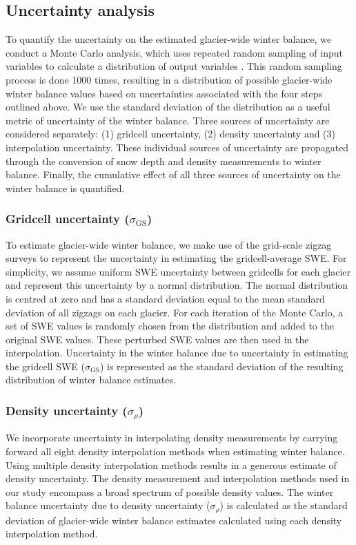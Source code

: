 \documentclass[twocolumn, letterpaper]{igs}
\begin{document}
\subsection{Uncertainty analysis}

To quantify the uncertainty on the estimated glacier-wide winter balance, we conduct a Monte Carlo analysis, which uses repeated random sampling of input variables to calculate a distribution of output variables \citep{Metropolis1949}. This random sampling process is done 1000 times, resulting in a distribution of possible glacier-wide winter balance values based on uncertainties associated with the four steps outlined above. We use the standard deviation of the distribution as a useful metric of uncertainty of the winter balance. Three sources of uncertainty are considered separately: (1) gridcell uncertainty, (2) density uncertainty and (3) interpolation uncertainty. These individual sources of uncertainty are propagated through the conversion of snow depth and density measurements to winter balance. Finally, the cumulative effect of all three sources of uncertainty on the winter balance is quantified.

	\subsubsection{Gridcell uncertainty ($\sigma_{\mathrm{GS}}$)}
To estimate glacier-wide winter balance, we make use of the grid-scale zigzag surveys to represent the uncertainty in estimating the gridcell-average SWE. For simplicity, we assume uniform SWE uncertainty between gridcells for each glacier and represent this uncertainty by a normal distribution. The normal distribution is centred at zero and has a standard deviation equal to the mean standard deviation of all zigzags on each glacier. For each iteration of the Monte Carlo, a set of SWE values is randomly chosen from the distribution and added to the original SWE values. These perturbed SWE values are then used in the interpolation. Uncertainty in the winter balance due to uncertainty in estimating the gridcell SWE ($\sigma_{\mathrm{GS}}$) is represented as the standard deviation of the resulting distribution of winter balance estimates.  

	\subsubsection{Density uncertainty ($\sigma_{\rho}$)}
We incorporate uncertainty in interpolating density measurements by carrying forward all eight density interpolation methods when estimating winter balance. Using multiple density interpolation methods results in a generous estimate of density uncertainty. The density measurement and interpolation methods used in our study encompass a broad spectrum of possible density values. The winter balance uncertainty due to density uncertainty ($\sigma_{\rho}$) is calculated as the standard deviation of glacier-wide winter balance estimates calculated using each density interpolation method.
\end{document}

